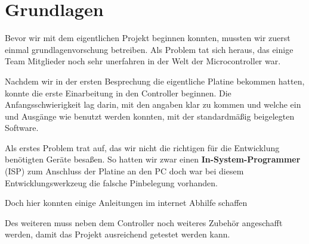 \chapter{Grundlagen}

Bevor wir mit dem eigentlichen Projekt beginnen konnten, 
mussten wir zuerst einmal grundlagenvorschung betreiben.
Als Problem tat sich heraus, das einige Team Mitglieder
noch sehr unerfahren in der Welt der Microcontroller war.

Nachdem wir in der ersten Besprechung die eigentliche Platine bekommen hatten,
konnte die erste Einarbeitung in den Controller beginnen.
Die Anfangsschwierigkeit lag darin, mit den angaben klar zu kommen 
und welche ein und Ausgänge wie benutzt werden konnten, mit der 
standardmäßig beigelegten Software.

Als erstes Problem trat auf, das wir nicht die richtigen für die
Entwicklung benötigten Geräte besaßen.
So hatten wir zwar einen \textbf{In-System-Programmer} (ISP) zum 
Anschluss der Platine an den PC doch war bei diesem Entwicklungswerkzeug
die falsche Pinbelegung vorhanden.

Doch hier konnten einige Anleitungen im internet Abhilfe schaffen

Des weiteren muss neben dem Controller noch weiteres Zubehör angeschafft werden,
damit das Projekt ausreichend getestet werden kann.


